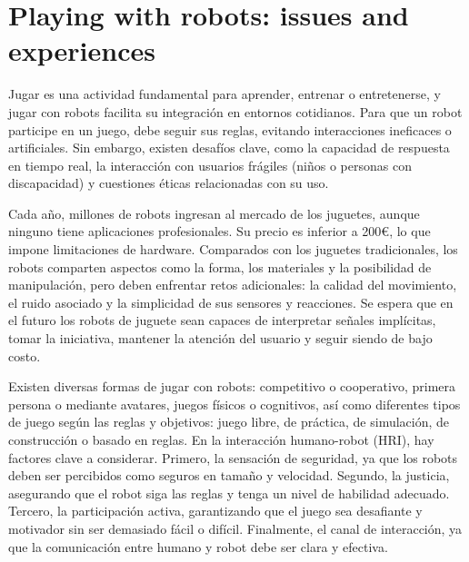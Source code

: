 
\newcommand{\estudiante}{García Justel, Alan}
\newcommand{\titulo}{MÁSTER EN INGENIERÍA COMPUTACIONAL Y SISTEMAS INTELIGENTES}
\newcommand{\asignatura}{ROBÓTICA}
\newcommand{\portada}{ROBOTIKA/images/portada_robotika.jpg}
\newcommand{\colorportada}{title_red}
\newcommand{\curso}{2024-2025}





\newpage

\tableofcontents\thispagestyle{empty} %
\newpage

\section{Playing with robots: issues and experiences}
Jugar es una actividad fundamental para aprender, entrenar o entretenerse, y jugar con robots facilita su integración en entornos cotidianos. Para que un robot participe en un juego, debe seguir sus reglas, evitando interacciones ineficaces o artificiales. Sin embargo, existen desafíos clave, como la capacidad de respuesta en tiempo real, la interacción con usuarios frágiles (niños o personas con discapacidad) y cuestiones éticas relacionadas con su uso.

Cada año, millones de robots ingresan al mercado de los juguetes, aunque ninguno tiene aplicaciones profesionales. Su precio es inferior a 200€, lo que impone limitaciones de hardware. Comparados con los juguetes tradicionales, los robots comparten aspectos como la forma, los materiales y la posibilidad de manipulación, pero deben enfrentar retos adicionales: la calidad del movimiento, el ruido asociado y la simplicidad de sus sensores y reacciones. Se espera que en el futuro los robots de juguete sean capaces de interpretar señales implícitas, tomar la iniciativa, mantener la atención del usuario y seguir siendo de bajo costo.

Existen diversas formas de jugar con robots: competitivo o cooperativo, primera persona o mediante avatares, juegos físicos o cognitivos, así como diferentes tipos de juego según las reglas y objetivos: juego libre, de práctica, de simulación, de construcción o basado en reglas. En la interacción humano-robot (HRI), hay factores clave a considerar. Primero, la sensación de seguridad, ya que los robots deben ser percibidos como seguros en tamaño y velocidad. Segundo, la justicia, asegurando que el robot siga las reglas y tenga un nivel de habilidad adecuado. Tercero, la participación activa, garantizando que el juego sea desafiante y motivador sin ser demasiado fácil o difícil. Finalmente, el canal de interacción, ya que la comunicación entre humano y robot debe ser clara y efectiva.

